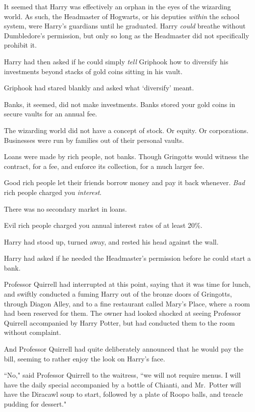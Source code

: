 It seemed that Harry was effectively an orphan in the eyes of the wizarding world. As such, the Headmaster of Hogwarts, or his deputies \emph{within} the school system, were Harry's guardians until he graduated. Harry \emph{could} breathe without Dumbledore's permission, but only so long as the Headmaster did not specifically prohibit it.

Harry had then asked if he could simply \emph{tell} Griphook how to diversify his investments beyond stacks of gold coins sitting in his vault.

Griphook had stared blankly and asked what `diversify' meant.

Banks, it seemed, did not make investments. Banks stored your gold coins in secure vaults for an annual fee.

The wizarding world did not have a concept of stock. Or equity. Or corporations. Businesses were run by families out of their personal vaults.

Loans were made by rich people, not banks. Though Gringotts would witness the contract, for a fee, and enforce its collection, for a much larger fee.

Good rich people let their friends borrow money and pay it back whenever. \emph{Bad} rich people charged you \emph{interest}.

There was no secondary market in loans.

Evil rich people charged you annual interest rates of at least 20\%.

Harry had stood up, turned away, and rested his head against the wall.

Harry had asked if he needed the Headmaster's permission before he could start a bank.

Professor Quirrell had interrupted at this point, saying that it was time for lunch, and swiftly conducted a fuming Harry out of the bronze doors of Gringotts, through Diagon Alley, and to a fine restaurant called Mary's Place, where a room had been reserved for them. The owner had looked shocked at seeing Professor Quirrell accompanied by Harry Potter, but had conducted them to the room without complaint.

And Professor Quirrell had quite deliberately announced that he would pay the bill, seeming to rather enjoy the look on Harry's face.

``No," said Professor Quirrell to the waitress, ``we will not require menus. I will have the daily special accompanied by a bottle of Chianti, and Mr.~Potter will have the Diracawl soup to start, followed by a plate of Roopo balls, and treacle pudding for dessert."

